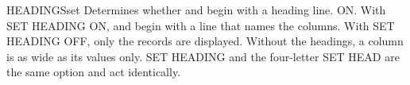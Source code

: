 \begin{XbaseEntry}{HEADINGS}{set}
Determines whether  and  begin with a heading line.
\Syntax
{}
\Defaults
ON.
\Usage
With SET HEADING ON,  and  begin with a line that names
the columns.  With SET HEADING OFF, only the records are displayed.  Without
the headings, a column is as wide as its values only.
SET HEADING and the four-letter SET HEAD are the same option and act identically.
\Examples
{}
\end{XbaseEntry}

